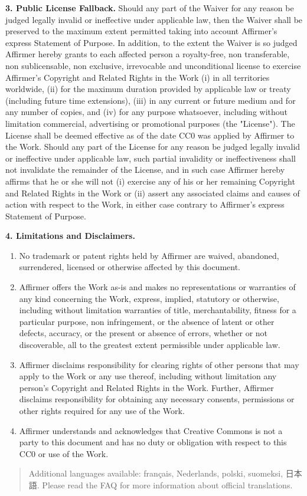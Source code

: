 \par \textbf{3. Public License Fallback.} Should any
part of the Waiver for any reason be judged legally invalid or
ineffective under applicable law, then the Waiver shall be
preserved to the maximum extent permitted taking into account
Affirmer's express Statement of Purpose. In addition, to the
extent the Waiver is so judged Affirmer hereby grants to each
affected person a royalty-free, non transferable, non
sublicensable, non exclusive, irrevocable and unconditional
license to exercise Affirmer's Copyright and Related Rights
in the Work (i) in all territories worldwide, (ii) for the
maximum duration provided by applicable law or treaty
(including future time extensions), (iii) in any current or
future medium and for any number of copies, and (iv) for any
purpose whatsoever, including without limitation commercial,
advertising or promotional purposes (the "License"). The
License shall be deemed effective as of the date CC0 was
applied by Affirmer to the Work. Should any part of the
License for any reason be judged legally invalid or
ineffective under applicable law, such partial invalidity or
ineffectiveness shall not invalidate the remainder of the
License, and in such case Affirmer hereby affirms that he or
she will not (i) exercise any of his or her remaining
Copyright and Related Rights in the Work or (ii) assert any
associated claims and causes of action with respect to the
Work, in either case contrary to Affirmer's express Statement
of Purpose.
\par \textbf{4. Limitations and Disclaimers.}
\begin{enumerate}
\item No trademark or patent rights held by Affirmer are
waived, abandoned, surrendered, licensed or otherwise
affected by this document.
\item Affirmer offers the Work as-is and makes no
representations or warranties of any kind concerning the
Work, express, implied, statutory or otherwise, including
without limitation warranties of title, merchantability,
fitness for a particular purpose, non infringement, or the
absence of latent or other defects, accuracy, or the present
or absence of errors, whether or not discoverable, all to
the greatest extent permissible under applicable law.
\item Affirmer disclaims responsibility for clearing rights of
other persons that may apply to the Work or any use thereof,
including without limitation any person's Copyright and
Related Rights in the Work. Further, Affirmer disclaims
responsibility for obtaining any necessary consents,
permissions or other rights required for any use of the
Work.
\item Affirmer understands and acknowledges that Creative
Commons is not a party to this document and has no duty or
obligation with respect to this CC0 or use of the Work.
\end{enumerate}
\begin{quotation}Additional languages available: français, Nederlands, polski, suomeksi, 日本語. Please read the FAQ for more information about official translations.\end{quotation}




